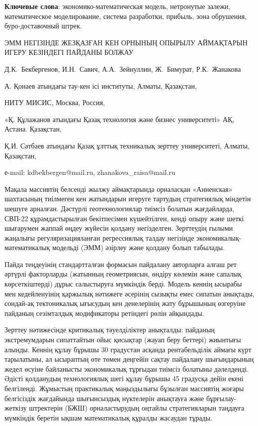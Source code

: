 {\bfseries Ключевые слова}: экономико-математическая модель, нетронутые
залежи, математическое моделирование, система разработки, прибыль, зона
обрушения, буро-доставочный штрек.
\vspace{1em}
\begin{header}
ЭММ НЕГІЗІНДЕ ЖЕЗҚАЗҒАН КЕН ОРНЫНЫҢ ОПЫРЫЛУ АЙМАҚТАРЫН ИГЕРУ КЕЗІНДЕГІ ПАЙДАНЫ БОЛЖАУ

Д.К.~Бекбергенов\envelope,
И.Н.~Савич,
А.А.~Зейнуллин,
Ж.~Бимурат,
Р.К.~Жанакова\envelope
\end{header}

\begin{affil}
А. Қонаев атындағы тау-кен ісі институты, Алматы, Қазақстан,

НИТУ МИСИС, Москва, Россия,

«Қ. Құлажанов атындағы Қазақ технология және бизнес университеті» АҚ, Астана. Қазақстан,

Қ.И. Сәтбаев атындағы Қазақ ұлттық техникалық зерттеу университеті, Алматы, Қазақстан,

е-mail: kdbekbergen@mail.ru, zhanakova\_raisa@mail.ru
\end{affil}

Мақала массивтің белсенді жылжу аймақтарында орналасқан «Анненская»
шахтасының тиілмеген кен жатындарын игеруге тартудың стратегиялық
міндетін шешуге арналған. Дәстүрлі геотехнологиялар тиімсіз болатын
жағдайларда, СВП-22 құрамдастырылған бекітпесімен күшейтілген, кенді
опыру және шеткі шығарумен жаппай өңдеу жүйесін қолдану негізделген.
Зерттеудің ғылыми жаңалығы регуляризацияланған регрессиялық талдау
негізінде экономикалық-математикалық модельді (ЭММ) әзірлеу және қолдану
болып табылады.

Пайда теңдеуінің стандартталған формасын пайдалану авторларға алғаш рет
әртүрлі факторларды (жатынның геометриясын, өндіру көлемін және сапалық
көрсеткіштерді) дұрыс салыстыруға мүмкіндік берді. Модель кеннің ысырабы
мен кедейленуінің қаржылық нәтижеге әсерінің сызықты емес сипатын
анықтады, сондай-ақ тектоникалық ығысудың кен денелерінің жату бұрышының
өзгеруіне пайданың сезімталдық модификаторы ретіндегі рөлін айқындады.

Зерттеу нәтижесінде критикалық тәуелділіктер анықталды: пайданың
экстремумдарын сипаттайтын ойыс қисықтар (жауап беру беттері) жиынтығы
алынды. Кеннің құлау бұрышы 30 градустан асқанда рентабельділік аймағы
күрт тарылатыны, ал ысыраптың өте төмен деңгейін сақтау пайдалану
шығындарының жедел өсуіне байланысты экономикалық тұрғыдан тиімсіз
болатыны дәлелденді. Әдісті қолданудың технологиялық шегі құлау бұрышы
45 градусқа дейін екені белгіленді. Жұмыстың практикалық маңыздылығы
бұзылған массивтің жоғары белгісіздік жағдайында шығынсыздық нүктелерін
анықтауға және бұрғылау-жеткізу штректерін (БЖШ) орналастырудың оңтайлы
стратегияларын таңдауға мүмкіндік беретін ықшам математикалық құралды
жасаудан тұрады.

